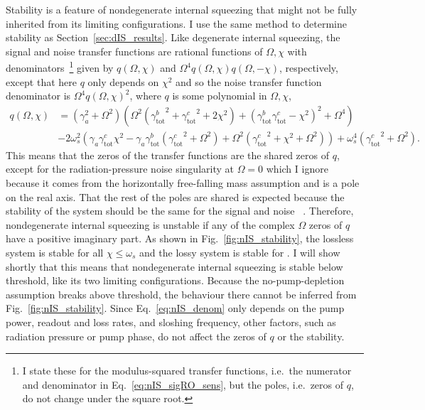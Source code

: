 Stability is a feature of nondegenerate internal squeezing that might not be fully inherited from its limiting configurations. I use the same method to determine stability as Section~\ref{sec:dIS_results}. Like degenerate internal squeezing, the signal and noise transfer functions are rational functions of $\Omega, \chi$ with denominators~\footnote{I state these for the modulus-squared transfer functions, i.e.\ the numerator and denominator in Eq.~\ref{eq:nIS_sigRO_sens}, but the poles, i.e.\ zeros of $q$, do not change under the square root.} given by $q(\Omega,\chi)$ and $\Omega^4 q(\Omega,\chi) q(\Omega,-\chi)$, respectively, except that here $q$ only depends on $\chi^2$ and so the noise transfer function denominator is $\Omega^4 q(\Omega,\chi)^2$, where $q$ is some polynomial in $\Omega, \chi$, 
\begin{align}\label{eq:nIS_denom}
q(\Omega,\chi)&=\left(\gamma_a^2+\Omega ^2\right) \left(\Omega ^2 \left({\gamma^b_\text{tot}}^2+{\gamma^c_\text{tot}}^2+2 \chi ^2\right)+\left({\gamma^b_\text{tot}} {\gamma^c_\text{tot}}-\chi ^2\right)^2+\Omega ^4\right)\\
&-2 \omega_s^2 \left(\gamma_a {\gamma^c_\text{tot}} \chi ^2-\gamma_a {\gamma^b_\text{tot}} \left({\gamma^c_\text{tot}}^2+\Omega ^2\right)+\Omega ^2 \left({\gamma^c_\text{tot}}^2+\chi ^2+\Omega ^2\right)\right)+\omega_s^4 \left({\gamma^c_\text{tot}}^2+\Omega ^2\right).
\end{align}
This means that the zeros of the transfer functions are the shared zeros of $q$, except for the radiation-pressure noise singularity at $\Omega=0$ which I ignore because it comes from the horizontally free-falling mass assumption and is a pole on the real axis. That the rest of the poles are shared is expected because the stability of the system should be the same for the signal and noise ~\cite{}.
Therefore, nondegenerate internal squeezing is unstable if any of the complex $\Omega$ zeros of $q$ have a positive imaginary part. As shown in Fig.~\ref{fig:nIS_stability}, the lossless system is stable for all $\chi\leq\omega_s$ and the lossy system is stable for . I will show shortly that this means that nondegenerate internal squeezing is stable below threshold, like its two limiting configurations. Because the no-pump-depletion assumption breaks above threshold, the behaviour there cannot be inferred from Fig.~\ref{fig:nIS_stability}.
Since Eq.~\ref{eq:nIS_denom} only depends on the pump power, readout and loss rates, and sloshing frequency, other factors, such as radiation pressure or pump phase, do not affect the zeros of $q$ or the stability.


